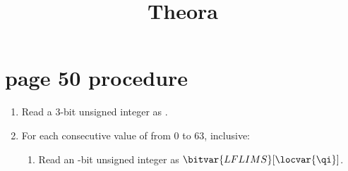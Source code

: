 \documentclass[12pt,a4paper]{article}
\begin{document}
\title{Theora}
\maketitle

\section{page 50 procedure}

\begin{enumerate}
    \item
    Read a 3-bit unsigned integer as .
    \item
    For each consecutive value of \locvar{\qi} from $0$ to $63$, inclusive:
    \begin{enumerate}
        \item
        Read an -bit unsigned integer as $\bitvar{LFLIMS}[\locvar{\qi}]$.
    \end{enumerate}
\end{enumerate}
\end{document}
